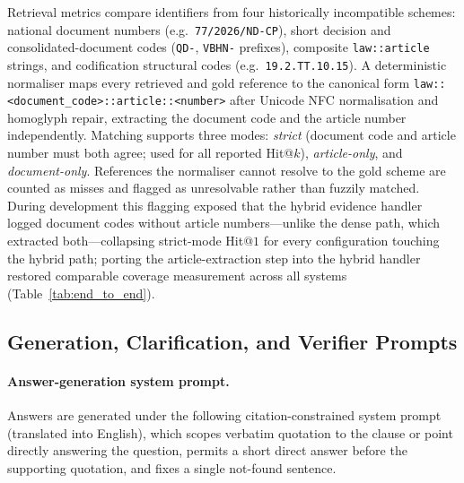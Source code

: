 \documentclass[pdflatex,sn-mathphys-num]{sn-jnl}
\begin{document}
Retrieval metrics compare identifiers from four historically incompatible
schemes: national document numbers (e.g.\ \texttt{77/2026/ND-CP}), short
decision and consolidated-document codes (\texttt{QD-}, \texttt{VBHN-}
prefixes), composite \texttt{law::article} strings, and codification
structural codes (e.g.\ \texttt{19.2.TT.10.15}). A deterministic normaliser
maps every retrieved and gold reference to the canonical form
\texttt{law::<document\_code>::article::<number>} after Unicode NFC
normalisation and homoglyph repair, extracting the document code and the
article number independently. Matching supports three modes: \emph{strict}
(document code and article number must both agree; used for all reported
Hit@$k$), \emph{article-only}, and \emph{document-only}. References the
normaliser cannot resolve to the gold scheme are counted as misses and
flagged as unresolvable rather than fuzzily matched. During development this
flagging exposed that the hybrid evidence handler logged document codes
without article numbers---unlike the dense path, which extracted
both---collapsing strict-mode Hit@$1$ for every configuration touching the
hybrid path; porting the article-extraction step into the hybrid handler
restored comparable coverage measurement across all systems
(Table~\ref{tab:end_to_end}).

\subsection{Generation, Clarification, and Verifier Prompts}\label{app:prompt}

\paragraph{Answer-generation system prompt.}
Answers are generated under the following citation-constrained system prompt
(translated into English), which scopes verbatim quotation to the clause or
point directly answering the question, permits a short direct answer before
the supporting quotation, and fixes a single not-found sentence.
\end{document}
